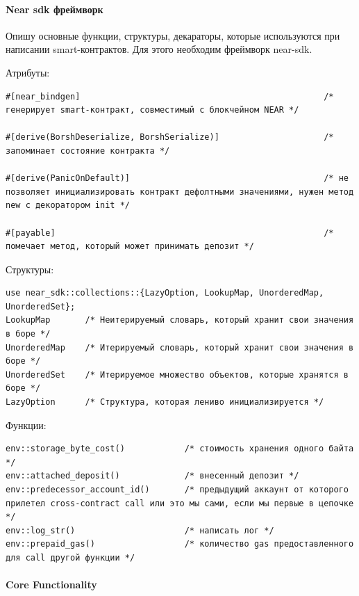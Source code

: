 \paragraph{Near sdk фреймворк}
Опишу основные функции, структуры, декараторы, которые используются при написании smart-контрактов. Для этого необходим фреймворк near-sdk\cite{nearsdkrs}.

Атрибуты:
\begin{verbatim}
#[near_bindgen]                                                 /* генерирует smart-контракт, совместимый с блокчейном NEAR */

#[derive(BorshDeserialize, BorshSerialize)]                     /* запоминает состояние контракта */

#[derive(PanicOnDefault)]                                       /* не позволяет инициализировать контракт дефолтными значениями, нужен метод new с декоратором init */

#[payable]                                                      /* помечает метод, который может принимать депозит */
\end{verbatim}

Структуры:

\begin{verbatim}
use near_sdk::collections::{LazyOption, LookupMap, UnorderedMap, UnorderedSet};
LookupMap       /* Неитерируемый словарь, который хранит свои значения в боре */
UnorderedMap    /* Итерируемый словарь, который хранит свои значения в боре */
UnorderedSet    /* Итерируемое множество объектов, которые хранятся в боре */
LazyOption      /* Структура, которая лениво инициализируется */
\end{verbatim}

Функции:
\begin{verbatim}
env::storage_byte_cost()            /* стоимость хранения одного байта */
env::attached_deposit()             /* внесенный депозит */
env::predecessor_account_id()       /* предыдущий аккаунт от которого прилетел cross-contract call или это мы сами, если мы первые в цепочке */
env::log_str()                      /* написать лог */
env::prepaid_gas()                  /* количество gas предоставленного для call другой функции */
\end{verbatim}

\paragraph{Core Functionality}

